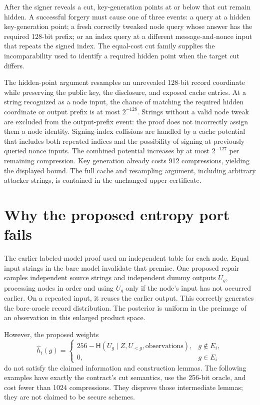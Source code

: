 \documentclass[10pt]{article}
\newcommand{\Ent}{\mathsf{H}}
\begin{document}
After the signer reveals a cut, key-generation points at or below that cut remain hidden. A successful forgery must cause one of three events: a query at a hidden key-generation point; a fresh correctly tweaked node query whose answer has the required 128-bit prefix; or an index query at a different message-and-nonce input that repeats the signed index. The equal-cost cut family supplies the incomparability used to identify a required hidden point when the target cut differs.

The hidden-point argument resamples an unrevealed 128-bit record coordinate while preserving the public key, the disclosure, and exposed cache entries. At a string recognized as a node input, the chance of matching the required hidden coordinate or output prefix is at most $2^{-128}$. Strings without a valid node tweak are excluded from the output-prefix event: the proof does not incorrectly assign them a node identity. Signing-index collisions are handled by a cache potential that includes both repeated indices and the possibility of signing at previously queried nonce inputs. The combined potential increases by at most $2^{-127}$ per remaining compression. Key generation already costs 912 compressions, yielding the displayed bound. The full cache and resampling argument, including arbitrary attacker strings, is contained in the unchanged upper certificate.

\appendix

\section{Why the proposed entropy port fails}\label{sec:obstructions}

The earlier labeled-model proof used an independent table for each node. Equal input strings in the bare model invalidate that premise. One proposed repair samples independent source strings and independent dummy outputs $U_g$, processing nodes in order and using $U_g$ only if the node's input has not occurred earlier. On a repeated input, it reuses the earlier output. This correctly generates the bare-oracle record distribution. The posterior is uniform in the preimage of an observation in this enlarged product space.

However, the proposed weights
\[
\widehat h_i(g)=
\begin{cases}
256-\Ent(U_g\mid Z,U_{<g},\text{observations}),&g\notin E_i,\\
0,&g\in E_i
\end{cases}
\]
do not satisfy the claimed information and construction lemmas. The following examples have exactly the contract's cut semantics, use the 256-bit oracle, and cost fewer than 1024 compressions. They disprove those intermediate lemmas; they are not claimed to be secure schemes.
\end{document}
